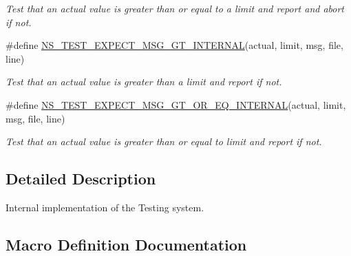 \begin{DoxyCompactItemize}
\begin{DoxyCompactList}\small\item\em Test that an actual value is greater than or equal to a limit and report and abort if not. \end{DoxyCompactList}\item 
\#define \hyperlink{group__testingimpl_ga37eb592b062b1d8ff5086dbbc2668994}{N\+S\+\_\+\+T\+E\+S\+T\+\_\+\+E\+X\+P\+E\+C\+T\+\_\+\+M\+S\+G\+\_\+\+G\+T\+\_\+\+I\+N\+T\+E\+R\+N\+AL}(actual,  limit,  msg,  file,  line)
\begin{DoxyCompactList}\small\item\em Test that an actual value is greater than a limit and report if not. \end{DoxyCompactList}\item 
\#define \hyperlink{group__testingimpl_ga63a10e334a06ab384256d1fbc4b7eb29}{N\+S\+\_\+\+T\+E\+S\+T\+\_\+\+E\+X\+P\+E\+C\+T\+\_\+\+M\+S\+G\+\_\+\+G\+T\+\_\+\+O\+R\+\_\+\+E\+Q\+\_\+\+I\+N\+T\+E\+R\+N\+AL}(actual,  limit,  msg,  file,  line)
\begin{DoxyCompactList}\small\item\em Test that an actual value is greater than or equal to limit and report if not. \end{DoxyCompactList}\end{DoxyCompactItemize}


\subsection{Detailed Description}
Internal implementation of the Testing system. 



\subsection{Macro Definition Documentation}
